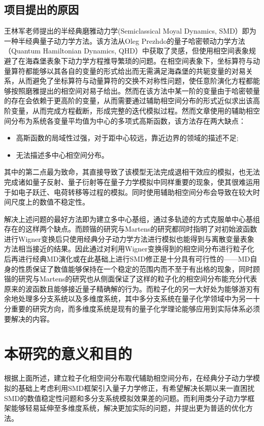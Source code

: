 \subsection{项目提出的原因}
王林军老师提出的半经典磨雅动力学(Semiclassical Moyal Dynamics, SMD）即为一种半经典量子动力学方法\cite{LinjunSemiclassical}。该方法从Oleg Prezhdo的量子哈密顿动力学方法\cite{OlegQHD}（Quantum Hamiltonian Dynamics, QHD）中获取了灵感，但使用相空间表象规避了在海森堡表象下动力学方程推导繁琐的问题。在相空间表象下，坐标算符与动量算符都能够以其各自的变量的形式给出而无需满足海森堡的共轭变量的对易关系\cite{wigner1997quantum}，从而避免了坐标算符与动量算符的交换不对称性问题，使任意阶演化方程都能够按照磨雅提出的相空间对易子\cite{moyal1949quantum}给出。然而在该方法中某一阶的变量由于哈密顿量的存在会依赖于更高阶的变量，从而需要通过辅助相空间分布的形式近似求出该高阶变量，从而完成方程截断，形成完整的迭代模拟过程。然而文章使用的辅助相空间分布为系统各变量平均值为中心的多项式高斯函数，该方法存在两大缺点：
\begin{itemize}
	\item 高斯函数的局域性过强，对于距中心较远，靠近边界的领域的描述不足;
	\item 无法描述多中心相空间分布。
\end{itemize}
其中的第二点最为致命，其直接导致了该模型无法完成退相干效应的模拟，也无法完成诸如量子反射、量子衍射等在量子力学模拟中同样重要的现象\cite{YifanShenPSQHD}，使其很难运用于如电子跃迁、电荷转移等过程的模拟。同时使用辅助相空间分布会导致在较大时间尺度上的数值不稳定性\cite{kaiguPSQHD}。

解决上述问题的最好方法即为建立多中心基组\cite{kaiguPSQHD}，通过多轨迹的方式克服单中心基组存在的这样两个缺点。而顾锴的研究与Martens的研究都同时指明了对初始波函数进行Wigner变换后只使用经典分子动力学方法进行模拟也能得到与离散变量表象方法相当接近的结果\cite{kaiguPSQHD,donoso2000simulation}。因此通过对利用Wigner变换得到的相空间分布进行粒子化后再进行经典MD演化或在此基础上进行SMD修正是十分具有可行性的——MD自身的性质保证了数值能够保持在一个稳定的范围内而不至于有出格的现象，同时顾锴的研究与Martens的研究也从侧面保证了这样的粒子化的相空间分布能充分代表原来的波函数且能够接近量子精确解的行为。而粒子化的另一大好处为能够游刃有余地处理多分支系统以及多维度系统，其中多分支系统在量子化学领域中为另一十分重要的研究方向，而多维度系统是现有的量子化学理论能够应用到实际体系必须要解决的内容。

\section{本研究的意义和目的}
根据上面所述，建立粒子化相空间分布取代辅助相空间分布，在经典分子动力学模拟的基础上考虑利用SMD框架引入量子力学修正，有希望解决长期以来一直困扰SMD的数值稳定性问题和多分支系统模拟效果差的问题。而利用类分子动力学框架能够轻易延伸至多维度系统，解决更加实际的问题，并提出更为普适的优化方法。
